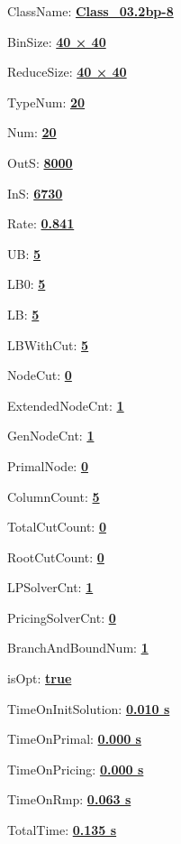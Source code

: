 \documentclass[11pt]{article}
\begin{document}
\pagestyle{empty}


ClassName: \underline{\textbf{Class_03.2bp-8}}
\par
BinSize: \underline{\textbf{40 × 40}}
\par
ReduceSize: \underline{\textbf{40 × 40}}
\par
TypeNum: \underline{\textbf{20}}
\par
Num: \underline{\textbf{20}}
\par
OutS: \underline{\textbf{8000}}
\par
InS: \underline{\textbf{6730}}
\par
Rate: \underline{\textbf{0.841}}
\par
UB: \underline{\textbf{5}}
\par
LB0: \underline{\textbf{5}}
\par
LB: \underline{\textbf{5}}
\par
LBWithCut: \underline{\textbf{5}}
\par
NodeCut: \underline{\textbf{0}}
\par
ExtendedNodeCnt: \underline{\textbf{1}}
\par
GenNodeCnt: \underline{\textbf{1}}
\par
PrimalNode: \underline{\textbf{0}}
\par
ColumnCount: \underline{\textbf{5}}
\par
TotalCutCount: \underline{\textbf{0}}
\par
RootCutCount: \underline{\textbf{0}}
\par
LPSolverCnt: \underline{\textbf{1}}
\par
PricingSolverCnt: \underline{\textbf{0}}
\par
BranchAndBoundNum: \underline{\textbf{1}}
\par
isOpt: \underline{\textbf{true}}
\par
TimeOnInitSolution: \underline{\textbf{0.010 s}}
\par
TimeOnPrimal: \underline{\textbf{0.000 s}}
\par
TimeOnPricing: \underline{\textbf{0.000 s}}
\par
TimeOnRmp: \underline{\textbf{0.063 s}}
\par
TotalTime: \underline{\textbf{0.135 s}}
\par
\newpage


\end{document}
